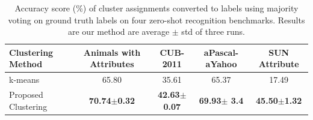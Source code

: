 \documentclass[letterpaper]{article}
\begin{document}
\begin{table}[ht]
\begin{minipage}{\textwidth}
\centering
\caption{Accuracy score (\%) of cluster assignments converted to labels
using majority voting on ground truth labels on four zero-shot recognition benchmarks.
Results are our method are average $\pm$ std of three runs.
} \vspace{2mm} \label{tab:cluster}
\begin{tabular}{|l|c|c|c|c|}
\hline
Clustering Method & Animals with Attributes & CUB-2011 & aPascal-aYahoo & SUN Attribute \\
\hline
k-means                             &  65.80                 & 35.61           & 65.37                & 17.49    \\
\hline
Proposed Clustering                     & \textbf{70.74$\pm$0.32}  & \textbf{42.63$\pm$0.07} & \textbf{69.93$\pm$ 3.4} & \textbf{ 45.50$\pm$1.32} \\
\hline
\end{tabular}
\vspace{2mm}
\end{minipage}
\end{table}
\end{document}
